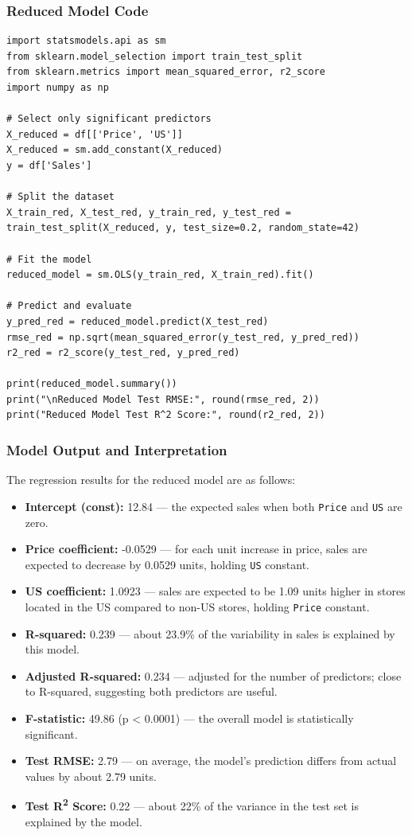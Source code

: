 \documentclass[12pt]{article}
\begin{document}
\subsubsection*{Reduced Model Code}
\begin{verbatim}
import statsmodels.api as sm
from sklearn.model_selection import train_test_split
from sklearn.metrics import mean_squared_error, r2_score
import numpy as np

# Select only significant predictors
X_reduced = df[['Price', 'US']]
X_reduced = sm.add_constant(X_reduced)
y = df['Sales']

# Split the dataset
X_train_red, X_test_red, y_train_red, y_test_red = train_test_split(X_reduced, y, test_size=0.2, random_state=42)

# Fit the model
reduced_model = sm.OLS(y_train_red, X_train_red).fit()

# Predict and evaluate
y_pred_red = reduced_model.predict(X_test_red)
rmse_red = np.sqrt(mean_squared_error(y_test_red, y_pred_red))
r2_red = r2_score(y_test_red, y_pred_red)

print(reduced_model.summary())
print("\nReduced Model Test RMSE:", round(rmse_red, 2))
print("Reduced Model Test R^2 Score:", round(r2_red, 2))
\end{verbatim}

\subsubsection*{Model Output and Interpretation}

The regression results for the reduced model are as follows:

\begin{itemize}
    \item \textbf{Intercept (const):} 12.84 — the expected sales when both \texttt{Price} and \texttt{US} are zero.
    \item \textbf{Price coefficient:} -0.0529 — for each unit increase in price, sales are expected to decrease by 0.0529 units, holding \texttt{US} constant.
    \item \textbf{US coefficient:} 1.0923 — sales are expected to be 1.09 units higher in stores located in the US compared to non-US stores, holding \texttt{Price} constant.
    \item \textbf{R-squared:} 0.239 — about 23.9\% of the variability in sales is explained by this model.
    \item \textbf{Adjusted R-squared:} 0.234 — adjusted for the number of predictors; close to R-squared, suggesting both predictors are useful.
    \item \textbf{F-statistic:} 49.86 (p < 0.0001) — the overall model is statistically significant.
    \item \textbf{Test RMSE:} 2.79 — on average, the model's prediction differs from actual values by about 2.79 units.
    \item \textbf{Test R\textsuperscript{2} Score:} 0.22 — about 22\% of the variance in the test set is explained by the model.
\end{itemize}
\end{document}
